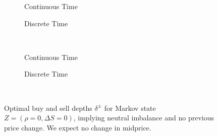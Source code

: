 \begin{figure}
\centering
\begin{subfigure}{.35\linewidth}
  \centering
  \setlength\figureheight{\linewidth} 
  \setlength\figurewidth{\linewidth}
  
  \caption{Continuous Time}
\end{subfigure}%
\hfil%
\begin{subfigure}{.35\linewidth}
  \centering
  \setlength\figureheight{\linewidth}
  \setlength\figurewidth{\linewidth}
   
  \caption{Discrete Time}
\end{subfigure}\\
\vspace{1cm}
\begin{subfigure}{.35\linewidth}
  \centering
  \setlength\figureheight{\linewidth} 
  \setlength\figurewidth{\linewidth}
  
  \caption{Continuous Time}
\end{subfigure}%
\hfil%
\begin{subfigure}{.35\linewidth}
  \centering
  \setlength\figureheight{\linewidth}
  \setlength\figurewidth{\linewidth}
   
  \caption{Discrete Time}
\end{subfigure}\\
\vspace{1cm}
\begin{subfigure}{\linewidth}
  \centering
   
\end{subfigure}%
  \caption{Optimal buy and sell depths $\delta^{\pm}$ for Markov state $Z=(\rho = 0, \Delta S = 0)$, implying neutral imbalance and no previous price change. We expect no change in midprice.}
  \label{fig:comp_dm_z8}
\end{figure}

